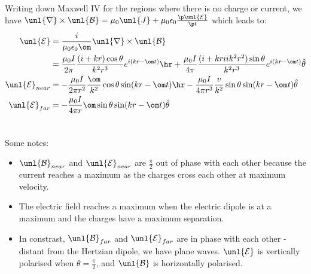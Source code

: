 \documentclass[a4paper, 11pt, normalem]{report}
\renewcommand\E{\mathcal{E}}
\newcommand\uE{\unl{\E}}
\renewcommand\B{\mathcal{B}}
\newcommand\uB{\unl{\B}}
\renewcommand\del{\unl{\nabla}}
\newcommand\eno{\epsilon_0}
\newcommand\J{\unl{J}}
\begin{document}
Writing down Maxwell \RN{4} for the regions where there is no charge or current, we have $\del\times\uB = \mu_0\J + \mu_0\eno\frac{\p\uE}{\p t}$ which leads to:
\begin{align}
	\uE &= \frac{i}{\mu_0\eno\om}\del\times\uB \\
	&= \frac{\mu_0I}{2\pi}\frac{(i + kr)\cos\theta}{k^2r^3}e^{i(kr - \om t)}\hr + \frac{\mu_0I}{4\pi}\frac{(i+kriik^2r^2)\sin\theta}{k^2r^3}e^{i(kr - \om t)}\hat{\theta} \\
	\uE_{near} &= -\frac{\mu_0I}{2\pi r^2}\frac{\om}{k^2}\cos\theta\sin(kr - \om t)\hr - \frac{\mu_0I}{4\pi r^3}\frac{v}{k^2}\sin\theta\sin(kr - \om t)\hat{\theta} \\
	\uE_{far} &= -\frac{\mu_0I}{4\pi r}\om\sin\theta\sin(kr - \om t)\hat{\theta}
\end{align}

\chapter{}
Some notes:
\begin{itemize}
	\item $\uB_{near}$ and $\uE_{near}$ are $\frac{\pi}{2}$ out of phase with each other because the current reaches a maximum as the charges cross each other at maximum velocity.
	\item The electric field reaches a maximum when the electric dipole is at a maximum and the charges have a maximum separation.
	\item In constrast, $\uB_{far}$ and $\uE_{far}$ are in phase with each other - distant from the Hertzian dipole, we have plane waves. $\uE$ is vertically polarised when $\theta = \frac{\pi}{2}$, and $\uB$ is horizontally polarised.
\end{itemize}
\end{document}
